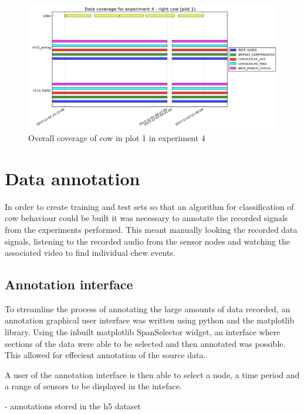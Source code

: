 \begin{figure}[ht!]
\begin{center}
\leavevmode
\includegraphics[width=1\textwidth]{images/experiment4_coverage_zoomed.png}
\end{center}
\caption{Overall coverage of cow in plot 1 in experiment 4}
\label{exp4overall}
\end{figure}

\section{Data annotation}

In order to create training and test sets so that an algorithm for classification of cow behaviour could be built it was necessary to annotate the recorded signals from the experiments performed. This meant manually looking the recorded data signals, listening to the recorded audio from the sensor nodes and watching the associated video to find individual chew events. 

\subsection{Annotation interface}

To streamline the process of annotating the large amounts of data recorded, an annotation graphical user interface was written using python and the matplotlib library. Using the inbuilt matplotlib SpanSelector widget, an interface where sections of the data were able to be selected and then annotated was possible. This allowed for effecient annotation of the source data. 

A user of the annotation interface is then able to select a node, a time period and a range of sensors to be displayed in the inteface. 

- annotations stored in the h5 dataset



